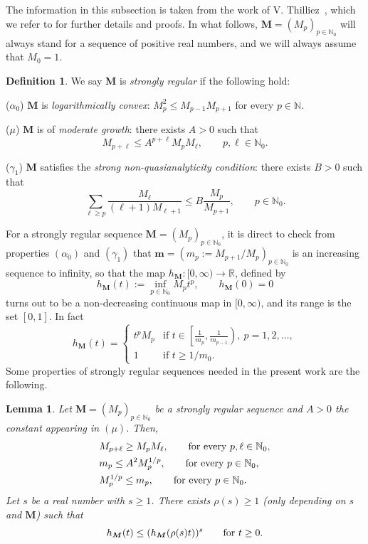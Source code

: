 \documentclass[11pt,a4paper,leqno]{article}
\theoremstyle{plain}
\newtheorem{lemma}[theo]{Lemma}
\theoremstyle{definition}
\newtheorem{defin}[theo]{Definition}
\def\N{\mathbb{N}}
\def\R{\mathbb{R}}
\def\a{\alpha}
\def\bM{\boldsymbol{M}}
\def\bm{\boldsymbol{m}}
\begin{document}
The information in this subsection is taken from the work of V. Thilliez~\cite{thilliez}, which we refer to for further details and proofs.
In what follows, $\bM=(M_p)_{p\in\N_0}$ will always stand for a sequence of
positive real numbers, and we will always assume that $M_0=1$.
\begin{defin}\label{sucfuereg}
We say $\bM$ is \textit{strongly regular} if the following hold:\par
($\a_0$) $\bM$ is \textit{logarithmically convex}: $M_{p}^{2}\le M_{p-1}M_{p+1}$ for
every $p\in\N$.\par
($\mu$) $\bM$ is of \textit{moderate growth}: there exists $A>0$ such that
$$M_{p+\ell}\le A^{p+\ell}M_{p}M_{\ell},\qquad p,\ell\in\N_0.$$
\par($\gamma_1$) $\bM$ satisfies the \textit{strong non-quasianalyticity condition}: there exists $B>0$ such that
$$
\sum_{\ell\ge p}\frac{M_{\ell}}{(\ell+1)M_{\ell+1}}\le B\frac{M_{p}}{M_{p+1}},\qquad p\in\N_0.
$$
\end{defin}
For a strongly regular sequence $\bM=(M_{p})_{p\in\N_0}$, it is direct to check from properties $(\alpha_0)$ and $(\gamma_{1})$ that $\bm=(m_{p}:=M_{p+1}/M_{p})_{p\in\N_0}$ is an increasing sequence to infinity, so that the map $h_{\bM}:[0,\infty)\to\R$, defined by
$$h_{\bM}(t):=\inf_{p\in\N_{0}}M_{p}t^p,\qquad h_{\bM}(0)=0$$
turns out to be a non-decreasing continuous map in $[0,\infty)$, and its range is the set $[0,1]$. In fact
$$
h_{\bM}(t)= \left \{ \begin{matrix}  t^{p}M_{p} & \mbox{if }t\in\left[\frac{1}{m_{p}}\right. ,\left. \frac{1}{m_{p-1}}\right),\ p=1,2,\ldots,\\
1 & \mbox{if } t\ge 1/m_{0}. \end{matrix}\right.
$$
Some properties of strongly regular sequences needed in the present work are the following.
\begin{lemma}
Let $\bM=(M_{p})_{p\in\N_0}$ be a strongly regular sequence and $A>0$ the constant appearing in $(\mu)$. Then,
\begin{align}
\label{propgrowth}
&M_{p+\ell}\ge M_pM_{\ell},\qquad \hbox{for every }p,\ell\in\N_0,\\
\label{e107}
&m_{p}\le A^{2}M_{p}^{1/p},\qquad \hbox{for every }p\in\N_0,\\
\label{e115}
&M_{p}^{1/p}\le m_{p},\qquad \hbox{for every }p\in\N_0.
\end{align}
Let $s$ be a real number with $s\ge1$. There exists $\rho(s)\ge1$ (only depending on $s$ and $\bM$) such that
\begin{equation}\label{e120}
h_{\bM}(t)\le(h_{\bM}(\rho(s)t))^{s}\qquad\hbox{for }t\ge0.
\end{equation}
\end{lemma}
\end{document}
